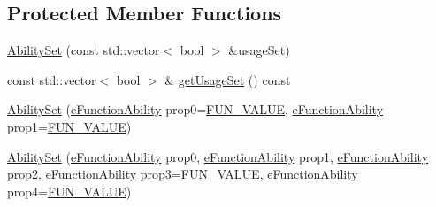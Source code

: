 \subsection*{Protected Member Functions}
\begin{DoxyCompactItemize}
\item 
\hyperlink{classocra_1_1AbilitySet_a0438cd73b840913711d2e7a768ff343a}{Ability\+Set} (const std\+::vector$<$ bool $>$ \&usage\+Set)
\item 
const std\+::vector$<$ bool $>$ \& \hyperlink{classocra_1_1AbilitySet_addb35b29c0ee151a0f93affde52a5570}{get\+Usage\+Set} () const
\end{DoxyCompactItemize}
{\bf }\par
\begin{DoxyCompactItemize}
\item 
\hyperlink{classocra_1_1AbilitySet_aec4a09919c73fc5e27aef8af05e7ebcf}{Ability\+Set} (\hyperlink{namespaceocra_a40ddbec106a6034cd2047bba9945b568}{e\+Function\+Ability} prop0=\hyperlink{namespaceocra_a40ddbec106a6034cd2047bba9945b568acfb47b20329993093d2022b017239bd8}{F\+U\+N\+\_\+\+V\+A\+L\+UE}, \hyperlink{namespaceocra_a40ddbec106a6034cd2047bba9945b568}{e\+Function\+Ability} prop1=\hyperlink{namespaceocra_a40ddbec106a6034cd2047bba9945b568acfb47b20329993093d2022b017239bd8}{F\+U\+N\+\_\+\+V\+A\+L\+UE})
\item 
\hyperlink{classocra_1_1AbilitySet_a7ac0f7bd650b04cef83728ea1d121015}{Ability\+Set} (\hyperlink{namespaceocra_a40ddbec106a6034cd2047bba9945b568}{e\+Function\+Ability} prop0, \hyperlink{namespaceocra_a40ddbec106a6034cd2047bba9945b568}{e\+Function\+Ability} prop1, \hyperlink{namespaceocra_a40ddbec106a6034cd2047bba9945b568}{e\+Function\+Ability} prop2, \hyperlink{namespaceocra_a40ddbec106a6034cd2047bba9945b568}{e\+Function\+Ability} prop3=\hyperlink{namespaceocra_a40ddbec106a6034cd2047bba9945b568acfb47b20329993093d2022b017239bd8}{F\+U\+N\+\_\+\+V\+A\+L\+UE}, \hyperlink{namespaceocra_a40ddbec106a6034cd2047bba9945b568}{e\+Function\+Ability} prop4=\hyperlink{namespaceocra_a40ddbec106a6034cd2047bba9945b568acfb47b20329993093d2022b017239bd8}{F\+U\+N\+\_\+\+V\+A\+L\+UE})
\item 

\end{DoxyCompactItemize}
